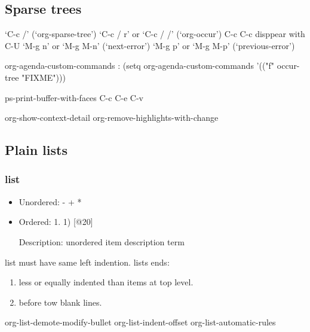 \documentclass[11pt]{article}
\begin{document}
\subsection{Sparse trees}
\label{sec:orgfa977b5}
‘C-c /’     (‘org-sparse-tree’)
‘C-c / r’  or  ‘C-c / /’     (‘org-occur’)     C-c C-c disppear    with C-U 
‘M-g n’  or  ‘M-g M-n’     (‘next-error’)
‘M-g p’  or  ‘M-g M-p’     (‘previous-error’)

org-agenda-custom-commands :
(setq org-agenda-custom-commands
           '(("f" occur-tree "FIXME")))

ps-print-buffer-with-faces
C-c C-e C-v

org-show-context-detail
org-remove-highlights-with-change
\subsection{Plain lists}
\label{sec:org947b3e0}
\subsubsection{list}
\label{sec:orgaed4ac0}
\begin{itemize}
\item Unordered: - + *
\item Ordered: 1. 1) [@20]
\item[{Description: unordered item}] description term
\end{itemize}

list must have same left indention.
lists ends:
\begin{enumerate}
\item less or equally indented than items at top level.
\item before tow blank lines.
\end{enumerate}

org-list-demote-modify-bullet
org-list-indent-offset
org-list-automatic-rules
\end{document}
